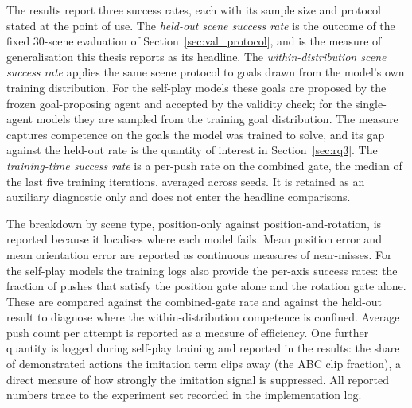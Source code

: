 The results report three success rates, each with its sample size and protocol
stated at the point of use. The \emph{held-out scene success rate} is the outcome
of the fixed 30-scene evaluation of Section~\ref{sec:val_protocol}, and is the
measure of generalisation this thesis reports as its headline. The
\emph{within-distribution scene success rate} applies the same scene protocol to
goals drawn from the model's own training distribution. For the self-play models
these goals are proposed by the frozen goal-proposing agent and accepted by the
validity check; for the single-agent models they are sampled from the training
goal distribution. The measure captures competence on the goals the model was
trained to solve, and its gap against the held-out rate is the quantity of
interest in Section~\ref{sec:rq3}. The \emph{training-time success rate} is a
per-push rate on the combined gate, the median of the last five training
iterations, averaged across seeds. It is retained as an auxiliary diagnostic only
and does not enter the headline comparisons.

The breakdown by scene type, position-only against position-and-rotation, is
reported because it localises where each model fails. Mean position error and
mean orientation error are reported as continuous measures of near-misses. For
the self-play models the training logs also provide the per-axis success rates:
the fraction of pushes that satisfy the position gate alone and the rotation
gate alone. These are compared against the combined-gate rate and against the
held-out result to diagnose where the within-distribution competence is confined.
Average push count per attempt is reported as a measure of efficiency. One
further quantity is logged during self-play training and reported in the results:
the share of demonstrated actions the imitation term clips away (the ABC clip
fraction), a direct measure of how strongly the imitation signal is suppressed.
All reported numbers trace to the experiment set recorded in the implementation
log.
